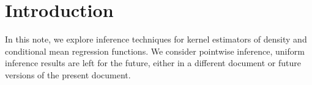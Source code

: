 
\section{Introduction}

In this note, we explore inference techniques for kernel estimators of density
and conditional mean regression functions.
We consider pointwise inference, uniform inference results are left for the
future, either in a different document or future versions of the present
document.



